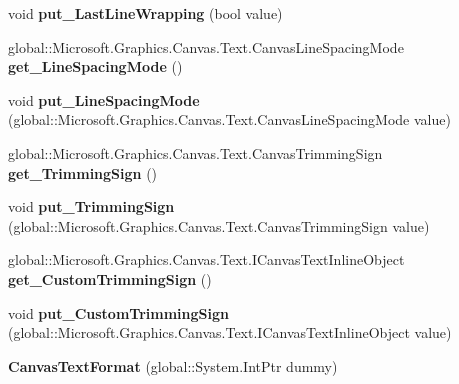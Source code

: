 \begin{DoxyCompactItemize}
\mbox{\label{class_microsoft_1_1_graphics_1_1_canvas_1_1_text_1_1_canvas_text_format_a3a6a2fc656c46147b1092b31a50db0c1}} 
void {\bfseries put\+\_\+\+Last\+Line\+Wrapping} (bool value)
\item 
\mbox{\label{class_microsoft_1_1_graphics_1_1_canvas_1_1_text_1_1_canvas_text_format_a27e6bacad5baec82340ced77aff91b82}} 
global\+::\+Microsoft.\+Graphics.\+Canvas.\+Text.\+Canvas\+Line\+Spacing\+Mode {\bfseries get\+\_\+\+Line\+Spacing\+Mode} ()
\item 
\mbox{\label{class_microsoft_1_1_graphics_1_1_canvas_1_1_text_1_1_canvas_text_format_a886014158def86d2f1cff0ef5008817f}} 
void {\bfseries put\+\_\+\+Line\+Spacing\+Mode} (global\+::\+Microsoft.\+Graphics.\+Canvas.\+Text.\+Canvas\+Line\+Spacing\+Mode value)
\item 
\mbox{\label{class_microsoft_1_1_graphics_1_1_canvas_1_1_text_1_1_canvas_text_format_ad94de231bbaf0d4dc6bb416b81343159}} 
global\+::\+Microsoft.\+Graphics.\+Canvas.\+Text.\+Canvas\+Trimming\+Sign {\bfseries get\+\_\+\+Trimming\+Sign} ()
\item 
\mbox{\label{class_microsoft_1_1_graphics_1_1_canvas_1_1_text_1_1_canvas_text_format_a8066e8fae4c8e5707dfa8324ea7faf5b}} 
void {\bfseries put\+\_\+\+Trimming\+Sign} (global\+::\+Microsoft.\+Graphics.\+Canvas.\+Text.\+Canvas\+Trimming\+Sign value)
\item 
\mbox{\label{class_microsoft_1_1_graphics_1_1_canvas_1_1_text_1_1_canvas_text_format_a50e09efee298194e2e557308c2a13012}} 
global\+::\+Microsoft.\+Graphics.\+Canvas.\+Text.\+I\+Canvas\+Text\+Inline\+Object {\bfseries get\+\_\+\+Custom\+Trimming\+Sign} ()
\item 
\mbox{\label{class_microsoft_1_1_graphics_1_1_canvas_1_1_text_1_1_canvas_text_format_a28ea164db75b0d1e4f012001370dc6f8}} 
void {\bfseries put\+\_\+\+Custom\+Trimming\+Sign} (global\+::\+Microsoft.\+Graphics.\+Canvas.\+Text.\+I\+Canvas\+Text\+Inline\+Object value)
\item 
\mbox{\label{class_microsoft_1_1_graphics_1_1_canvas_1_1_text_1_1_canvas_text_format_a8cbafb823def969fc2ed24c98d5016f7}} 
{\bfseries Canvas\+Text\+Format} (global\+::\+System.\+Int\+Ptr dummy)
\end{DoxyCompactItemize}

